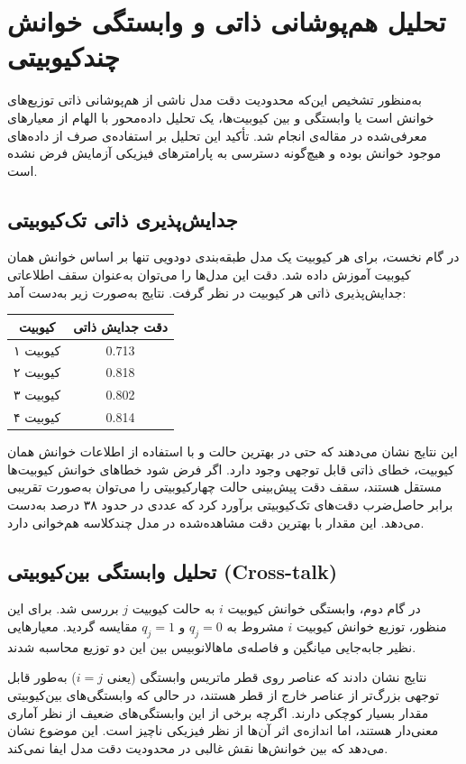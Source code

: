 \documentclass[12pt,a4paper]{article}
\begin{document}
\section{تحلیل هم‌پوشانی ذاتی و وابستگی خوانش چندکیوبیتی}
به‌منظور تشخیص این‌که محدودیت دقت مدل ناشی از هم‌پوشانی ذاتی توزیع‌های خوانش است یا وابستگی و  بین کیوبیت‌ها، یک تحلیل داده‌محور با الهام از معیارهای معرفی‌شده در مقاله‌ی
انجام شد. تأکید این تحلیل بر استفاده‌ی صرف از داده‌های موجود خوانش بوده و هیچ‌گونه دسترسی به پارامترهای فیزیکی آزمایش فرض نشده است.

\subsection{جدایش‌پذیری ذاتی تک‌کیوبیتی}
در گام نخست، برای هر کیوبیت یک مدل طبقه‌بندی دودویی تنها بر اساس خوانش همان کیوبیت آموزش داده شد. دقت این مدل‌ها را می‌توان به‌عنوان سقف اطلاعاتی جدایش‌پذیری ذاتی هر کیوبیت در نظر گرفت. نتایج به‌صورت زیر به‌دست آمد:
\begin{center}
\begin{tabular}{c c}
\hline
کیوبیت & دقت جدایش ذاتی \\
\hline
کیوبیت ۱ & 0.713 \\
کیوبیت ۲ & 0.818 \\
کیوبیت ۳ & 0.802 \\
کیوبیت ۴ & 0.814 \\
\hline
\end{tabular}
\end{center}

این نتایج نشان می‌دهند که حتی در بهترین حالت و با استفاده از اطلاعات خوانش همان کیوبیت، خطای ذاتی قابل توجهی وجود دارد. اگر فرض شود خطاهای خوانش کیوبیت‌ها مستقل هستند، سقف دقت پیش‌بینی حالت چهارکیوبیتی را می‌توان به‌صورت تقریبی برابر حاصل‌ضرب دقت‌های تک‌کیوبیتی برآورد کرد که عددی در حدود ۳۸ درصد به‌دست می‌دهد. این مقدار با بهترین دقت مشاهده‌شده در مدل چندکلاسه هم‌خوانی دارد.

\subsection{تحلیل وابستگی بین‌کیوبیتی (Cross-talk)}
در گام دوم، وابستگی خوانش کیوبیت $i$ به حالت کیوبیت $j$ بررسی شد. برای این منظور، توزیع خوانش کیوبیت $i$ مشروط به $q_j=0$ و $q_j=1$ مقایسه گردید. معیارهایی نظیر جابه‌جایی میانگین و فاصله‌ی ماهالانوبیس بین این دو توزیع محاسبه شدند.

نتایج نشان دادند که عناصر روی قطر ماتریس وابستگی (یعنی $i=j$) به‌طور قابل توجهی بزرگ‌تر از عناصر خارج از قطر هستند، در حالی که وابستگی‌های بین‌کیوبیتی مقدار بسیار کوچکی دارند. اگرچه برخی از این وابستگی‌های ضعیف از نظر آماری معنی‌دار هستند، اما اندازه‌ی اثر آن‌ها از نظر فیزیکی ناچیز است. این موضوع نشان می‌دهد که  بین خوانش‌ها نقش غالبی در محدودیت دقت مدل ایفا نمی‌کند.
\end{document}
